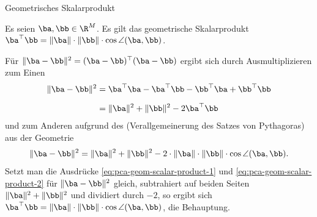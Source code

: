 \begin{frame}{Geometrisches Skalarprodukt}{}
	\begin{mytheo}
		Es seien $\ba, \bb \in \R^M$. Es gilt das geometrische Skalarprodukt
		$\ba^\top \bb = \Vert \ba \Vert \cdot \Vert \bb \Vert \cdot \cos \angle(\ba, \bb)$.
	\end{mytheo}

	\begin{myproof}
		Für $\Vert \ba - \bb \Vert^2 = (\ba - \bb)^\top (\ba - \bb)$ ergibt sich durch Ausmultiplizieren zum Einen
		\begin{equation} \label{eq:pca-geom-scalar-product-1}
			\begin{aligned}
				\Vert \ba - \bb \Vert^2
					&= \ba^\top \ba - \ba^\top \bb - \bb^\top \ba + \bb^\top \bb
			\\[2mm]
					&= \Vert \ba \Vert^2 + \Vert \bb \Vert^2 - 2 \ba^\top \bb
			\end{aligned}
		\end{equation}
		und zum Anderen aufgrund des  (Verallgemeinerung des Satzes von Pythagoras)
		aus der Geometrie
		\begin{equation} \label{eq:pca-geom-scalar-product-2}
			\Vert \ba - \bb \Vert^2
				= \Vert \ba \Vert^2 + \Vert \bb \Vert^2
				- 2 \cdot \Vert \ba \Vert \cdot \Vert \bb \Vert \cdot \cos \angle(\ba, \bb).
		\end{equation}
		Setzt man die Ausdrücke \eqref{eq:pca-geom-scalar-product-1} und \eqref{eq:pca-geom-scalar-product-2} für
		$\Vert \ba - \bb \Vert^2$ gleich, subtrahiert auf beiden Seiten $\Vert \ba \Vert^2 + \Vert \bb \Vert^2$ und
		dividiert durch $-2$, so ergibt sich $\ba^\top \bb = \Vert \ba \Vert \cdot \Vert \bb \Vert \cdot \cos \angle(\ba, \bb)$,
		die Behauptung.
	\end{myproof}
\end{frame}


